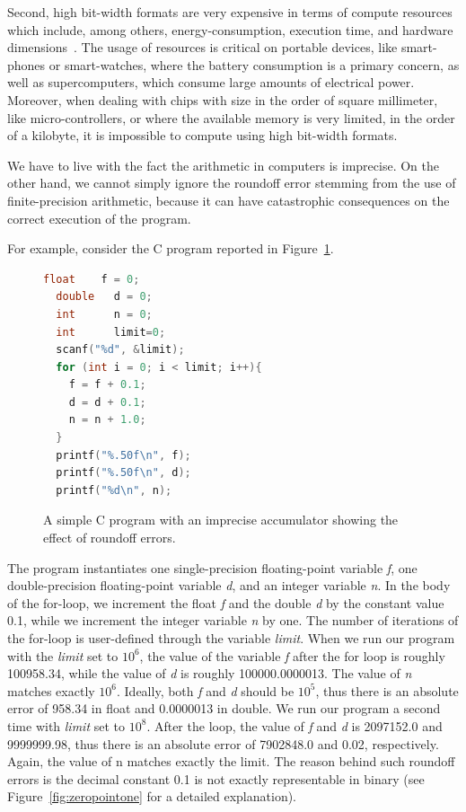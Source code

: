 Second, high bit-width formats are very expensive in terms of compute resources which include, among others, energy-consumption, execution time, and hardware dimensions~\cite{fppower, lutnet}. 
%
The usage of resources is critical on portable devices, like smart-phones or smart-watches, where the battery consumption is a primary concern, as well as supercomputers, which consume large amounts of electrical power.
%
Moreover, when dealing with chips with size in the order of square millimeter, like micro-controllers, or where the available memory is very limited, in the order of a kilobyte, it is impossible to compute using high bit-width formats.

%
We have to live with the fact the arithmetic in computers is imprecise.
%
On the other hand, we cannot simply ignore the roundoff error stemming from the use of finite-precision arithmetic, because it can have catastrophic consequences on the correct execution of the program.
%

For example, consider the C program reported in Figure~\ref{fig:while}.
%
\begin{figure}[tb!]
	\begin{lstlisting}[frame=single, language=c]
  float    f = 0;
  double   d = 0;
  int      n = 0;
  int      limit=0;
  scanf("%d", &limit);
  for (int i = 0; i < limit; i++){
    f = f + 0.1;
    d = d + 0.1;
    n = n + 1.0;
  }
  printf("%.50f\n", f);
  printf("%.50f\n", d);
  printf("%d\n", n);
	\end{lstlisting}
	\caption{A simple C program with an imprecise accumulator showing the effect of roundoff errors.}\label{fig:while}
\end{figure}
%
The program instantiates one single-precision floating-point variable \emph{f}, one double-precision floating-point variable \emph{d}, and an integer variable \emph{n}.
%
In the body of the for-loop, we increment the float \emph{f} and the double \emph{d} by the constant value 0.1, while we increment the integer variable \emph{n} by one.
%
The number of iterations of the for-loop is user-defined through the variable \emph{limit}.
%
When we run our program with the \emph{limit} set to $10^6$, the value of the variable \emph{f} after the for loop is roughly 100958.34, while the value of \emph{d} is roughly 100000.0000013. The value of \emph{n} matches exactly $10^6$.
%
Ideally, both \emph{f} and \emph{d} should be $10^5$, thus there is an absolute error of 958.34 in float and 0.0000013 in double.
%
We run our program a second time with \emph{limit} set to $10^8$. 
%
After the loop, the value of \emph{f} and \emph{d} is 2097152.0 and 9999999.98, thus there is an absolute error of 7902848.0 and 0.02, respectively. 
%
Again, the value of n matches exactly the limit.
%
The reason behind such roundoff errors is the decimal constant 0.1 is not exactly representable in binary (see Figure~\ref{fig:zeropointone} for a detailed explanation). 

